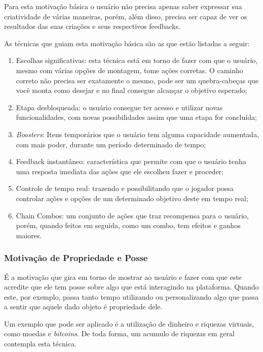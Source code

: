 Para esta motivação básica o usuário não precisa apenas saber expressar
sua criatividade de várias maneiras, porém, além disso, precisa ser capaz
de ver os resultados das suas criações e seus respectivos feedbacks.

As técnicas que guiam esta motivação básica são as que estão listadas
a seguir:

\begin{enumerate}
    \item Escolhas significativas: esta técnica está em torno de fazer
        com que o usuário, mesmo com várias opções de montagem,
        tome ações corretas. O caminho correto não precisa ser exatamente o mesmo,
        pode ser um quebra-cabeças que você monta como desejar e no final
        consegue alcançar o objetivo esperado;
    \item Etapa desbloqueada: o usuário consegue ter acesso
        e utilizar novas funcionalidades, com novas possibilidades
        assim que uma etapa for concluída;
    \item \textit{Boosters}: Itens temporários que o usuário tem alguma
        capacidade aumentada, com mais poder, durante um período
        determinado de tempo;
    \item Feedback instantâneo: característica que permite com que o usuário
        tenha uma resposta imediata das ações que ele escolheu fazer e proceder;
    \item Controle de tempo real: trazendo e possibilitando que o jogador
        possa controlar ações e opções de um determinado objetivo deste
        em tempo real;
    \item Chain Combos: um conjunto de ações que traz recompensa para o
        usuário, porém, quando feitos em seguida, como um combo, tem
        efeitos e ganhos maiores.
\end{enumerate}

\subsubsection{Motivação de Propriedade e Posse}
\label{sub:propriedadeeposse}
É a motivação que gira em torno de mostrar ao usuário e fazer com que
este acredite que ele tem posse sobre algo que está interagindo na
plataforma. Quando este, por exemplo, passa tanto tempo utilizando
ou personalizando algo que passa a sentir que aquele dado objeto
é propriedade dele.

Um exemplo que pode ser aplicado é a utilização de dinheiro e riquezas
virtuais, como moedas e \textit{bitcoins}. De toda forma, um acumulo de riquezas
em geral contempla esta técnica.

